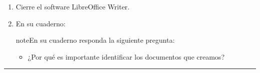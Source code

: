 \documentclass[letterpaper,10pt,spanish]{sphinxmanual}
\begin{document}
\begin{enumerate}
\item {} 
\sphinxAtStartPar
Cierre el software LibreOffice Writer.

\item {} 
\sphinxAtStartPar
En su cuaderno:

\begin{sphinxadmonition}{note}{En su cuaderno responda la siguiente pregunta:}
\begin{itemize}
\item {} 
\sphinxAtStartPar
¿Por qué es importante identificar los documentos que creamos?

\end{itemize}
\end{sphinxadmonition}

\end{enumerate}


\bigskip\hrule\bigskip
\end{document}
